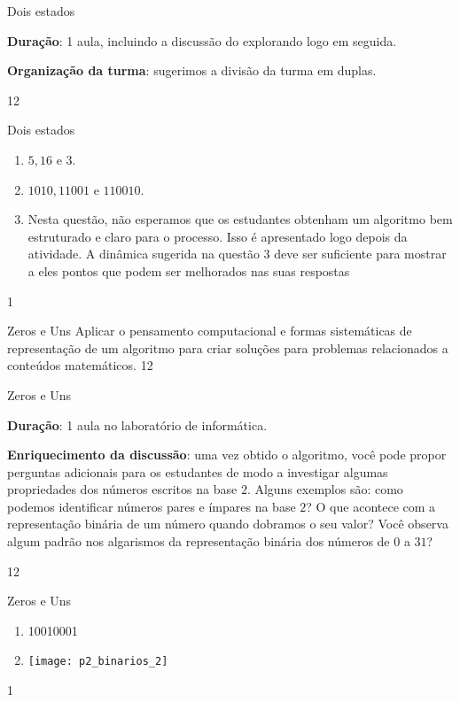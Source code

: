 \begin{sugestions}{Dois estados}
{
\textbf{Duração}: 1 aula, incluindo a discussão do explorando logo em seguida.

\textbf{Organização da turma}: sugerimos a divisão da turma em duplas.
}{1}{2}
\end{sugestions}
\begin{answer}{Dois estados}
{
\begin{enumerate}[left=1.5em]
\item $5, 16$ e $3$.

\item $1010, 11001 \text{ e } 110010$.

\item[\titem{c)} e \titem{d)}] Nesta questão, não esperamos que os estudantes obtenham um algoritmo bem estruturado e claro para o processo. Isso é apresentado logo depois da atividade. A dinâmica sugerida na questão 3 deve ser suficiente para mostrar a eles pontos que podem ser melhorados nas suas respostas
\end{enumerate}
}{1}
\end{answer}
\clearmargin
\clearmargin
\begin{objectives}{Zeros e Uns}
{
Aplicar o pensamento computacional e formas sistemáticas de representação de um algoritmo para criar soluções para problemas relacionados a conteúdos matemáticos.
}{1}{2}
\end{objectives}
\begin{sugestions}{Zeros e Uns}
{
\textbf{Duração}: 1 aula no laboratório de informática.

\textbf{Enriquecimento da discussão}: uma vez obtido o algoritmo, você pode propor perguntas adicionais para os estudantes de modo a investigar algumas propriedades dos números escritos na base $2$. Alguns exemplos são: como podemos identificar números pares e ímpares na base $2$? O que acontece com a representação binária de um número quando dobramos o seu valor? Você observa algum padrão nos algarismos da representação binária dos números de $0$ a $31$?
}{1}{2}
\end{sugestions}
\begin{answer}{Zeros e Uns}
{
\begin{enumerate}
\item 10010001
\item {}
{
\texttt{[image: p2\_binarios\_2]}
}
\end{enumerate}
}{1}
\end{answer}
\label{comp-exp6}



